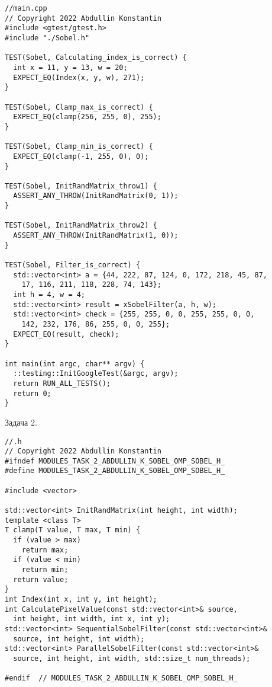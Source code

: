 \documentclass[12pt]{article}
\begin{document}
\begin{lstlisting}
//main.cpp
// Copyright 2022 Abdullin Konstantin
#include <gtest/gtest.h>
#include "./Sobel.h"

TEST(Sobel, Calculating_index_is_correct) {
  int x = 11, y = 13, w = 20;
  EXPECT_EQ(Index(x, y, w), 271);
}

TEST(Sobel, Clamp_max_is_correct) {
  EXPECT_EQ(clamp(256, 255, 0), 255);
}

TEST(Sobel, Clamp_min_is_correct) {
  EXPECT_EQ(clamp(-1, 255, 0), 0);
}

TEST(Sobel, InitRandMatrix_throw1) {
  ASSERT_ANY_THROW(InitRandMatrix(0, 1));
}

TEST(Sobel, InitRandMatrix_throw2) {
  ASSERT_ANY_THROW(InitRandMatrix(1, 0));
}

TEST(Sobel, Filter_is_correct) {
  std::vector<int> a = {44, 222, 87, 124, 0, 172, 218, 45, 87,
    17, 116, 211, 118, 228, 74, 143};
  int h = 4, w = 4;
  std::vector<int> result = xSobelFilter(a, h, w);
  std::vector<int> check = {255, 255, 0, 0, 255, 255, 0, 0,
    142, 232, 176, 86, 255, 0, 0, 255};
  EXPECT_EQ(result, check);
}

int main(int argc, char** argv) {
  ::testing::InitGoogleTest(&argc, argv);
  return RUN_ALL_TESTS();
  return 0;
}
\end{lstlisting}
Задача 2.
\begin{lstlisting}
//.h
// Copyright 2022 Abdullin Konstantin
#ifndef MODULES_TASK_2_ABDULLIN_K_SOBEL_OMP_SOBEL_H_
#define MODULES_TASK_2_ABDULLIN_K_SOBEL_OMP_SOBEL_H_

#include <vector>

std::vector<int> InitRandMatrix(int height, int width);
template <class T>
T clamp(T value, T max, T min) {
  if (value > max)
    return max;
  if (value < min)
    return min;
  return value;
}
int Index(int x, int y, int height);
int CalculatePixelValue(const std::vector<int>& source,
  int height, int width, int x, int y);
std::vector<int> SequentialSobelFilter(const std::vector<int>&
  source, int height, int width);
std::vector<int> ParallelSobelFilter(const std::vector<int>&
  source, int height, int width, std::size_t num_threads);

#endif  // MODULES_TASK_2_ABDULLIN_K_SOBEL_OMP_SOBEL_H_
\end{lstlisting}
\end{document}
